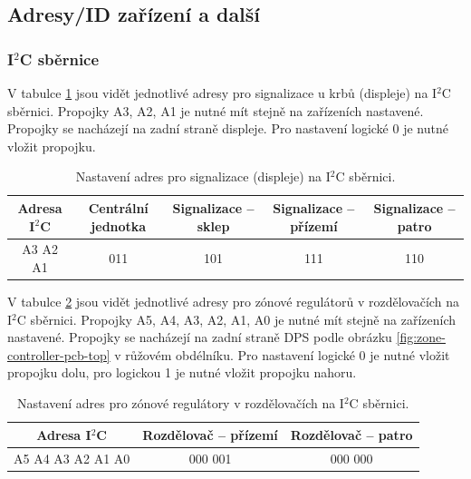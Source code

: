 
\begin{Czech}
\subsection{Adresy/ID zařízení a další}
\end{Czech}

\begin{Czech}
\subsubsection{I$^2$C sběrnice}
\end{Czech}

V tabulce \ref{tab:i2c-bus-signalizations} jsou vidět jednotlivé adresy pro signalizace u krbů (displeje) na I$^2$C sběrnici. Propojky A3, A2, A1 je nutné mít stejně na zařízeních nastavené. Propojky se nacházejí na zadní straně displeje. Pro nastavení logické 0 je nutné vložit propojku.

\begin{table}[H]
\centering
\begin{tabular}{||c || c c c c||} 
 \hline
 Adresa I$^2$C & Centrální jednotka & Signalizace – sklep & Signalizace – přízemí & Signalizace – patro \\  
 \hline\hline
  A3 A2 A1 & 011 & 101 & 111 & 110 \\ 
 \hline
\end{tabular}
\caption{Nastavení adres pro signalizace (displeje) na I$^2$C sběrnici.}
\label{tab:i2c-bus-signalizations}
\end{table}

V tabulce \ref{tab:i2c-bus-zone-controllers} jsou vidět jednotlivé adresy pro zónové regulátorů  v rozdělovačích na I$^2$C sběrnici. Propojky A5, A4, A3, A2, A1, A0 je nutné mít stejně na zařízeních nastavené. Propojky se nacházejí na zadní straně DPS podle obrázku \ref{fig:zone-controller-pcb-top} v růžovém obdélníku. Pro nastavení logické 0 je nutné vložit propojku dolu, pro logickou 1 je nutné vložit propojku nahoru.


\begin{table}[H]
\centering
\begin{tabular}{||c || c c ||} 
 \hline
 Adresa I$^2$C & Rozdělovač  – přízemí & Rozdělovač  – patro \\ 
 \hline\hline
 A5 A4 A3 A2 A1 A0 & 000 001 & 000 000\\ 
 \hline
\end{tabular}
\caption{Nastavení adres pro zónové regulátory v rozdělovačích na I$^2$C sběrnici.}
\label{tab:i2c-bus-zone-controllers}
\end{table}

